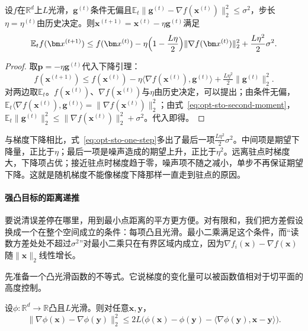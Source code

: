 \begin{lemma}[随机梯度的单步下降]
\label{lem:opt-sto-one-step}
设$f$在$\mathbb R^d$上$L$光滑，$\bm g^{(t)}$条件无偏且$\mathbb E_t\lVert\bm g^{(t)}-\nabla f(\bm x^{(t)})\rVert_2^2\leq\sigma^2$，步长$\eta=\eta^{(t)}$由历史决定。则$\bm x^{(t+1)}=\bm x^{(t)}-\eta\bm g^{(t)}$满足
\begin{equation}
\label{eq:opt-sto-one-step}
  \mathbb E_t f(\bm x^{(t+1)})\leq f(\bm x^{(t)})-\eta\Bigl(1-\frac{L\eta}2\Bigr)\lVert\nabla f(\bm x^{(t)})\rVert_2^2+\frac{L\eta^2}{2}\sigma^2 .
\end{equation}
\end{lemma}

\begin{proof}
取$\bm p=-\eta\bm g^{(t)}$代入下降引理：
\[
  f(\bm x^{(t+1)})\leq f(\bm x^{(t)})-\eta\langle\nabla f(\bm x^{(t)}),\bm g^{(t)}\rangle+\tfrac{L\eta^2}2\lVert\bm g^{(t)}\rVert_2^2 .
\]
对两边取$\mathbb E_t$。$f(\bm x^{(t)})$、$\nabla f(\bm x^{(t)})$与$\eta$由历史决定，可以提出；由条件无偏，$\mathbb E_t\langle\nabla f(\bm x^{(t)}),\bm g^{(t)}\rangle=\lVert\nabla f(\bm x^{(t)})\rVert_2^2$；由式~\eqref{eq:opt-sto-second-moment}，$\mathbb E_t\lVert\bm g^{(t)}\rVert_2^2\leq\lVert\nabla f(\bm x^{(t)})\rVert_2^2+\sigma^2$。代入即得。
\end{proof}

与梯度下降相比，式~\eqref{eq:opt-sto-one-step}多出了最后一项$\tfrac{L\eta^2}2\sigma^2$。中间项是期望下降量，正比于$\eta$；最后一项是噪声造成的期望上升，正比于$\eta^2$。远离驻点时梯度大，下降项占优；接近驻点时梯度趋于零，噪声项不随之减小，单步不再保证期望下降。这就是随机梯度不能像梯度下降那样一直走到驻点的原因。

\paragraph{强凸目标的距离递推}
要说清误差停在哪里，用到最小点距离的平方更方便。对有限和，我们把方差假设换成一个在整个空间成立的条件：每项凸且光滑。最小二乘满足这个条件，而“读数方差处处不超过$\sigma^2$”对最小二乘只在有界区域内成立，因为$\nabla f_i(\bm x)-\nabla f(\bm x)$随$\lVert\bm x\rVert_2$线性增长。

先准备一个凸光滑函数的不等式。它说梯度的变化量可以被函数值相对于切平面的高度控制。

\begin{lemma}[凸光滑函数的梯度差]
\label{lem:opt-sto-cocoercive}
设$\phi:\mathbb R^d\to\mathbb R$凸且$L$光滑。则对任意$\bm x,\bm y$，
\begin{equation}
\label{eq:opt-sto-gradient-gap}
  \lVert\nabla\phi(\bm x)-\nabla\phi(\bm y)\rVert_2^2\leq2L\bigl(\phi(\bm x)-\phi(\bm y)-\langle\nabla\phi(\bm y),\bm x-\bm y\rangle\bigr).
\end{equation}
\end{lemma}

